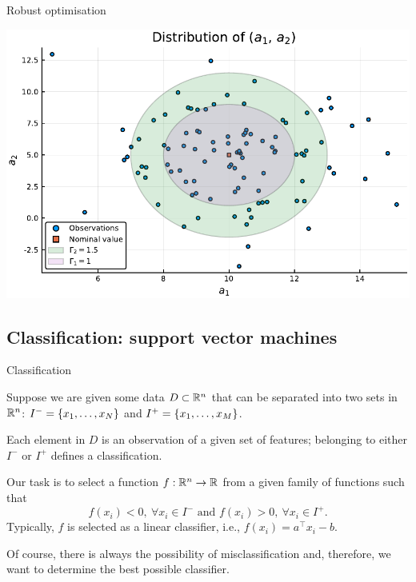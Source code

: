 \begin{frame}{Robust optimisation}

	\includegraphics[width = 1\textwidth]{Figures/data_with_ellipsoid.pdf}

\end{frame}


\subsection{Classification: support vector machines}


\begin{frame}{Classification}

	Suppose we are given some data $D \subset \mathbb R^n$ that can be \alert{separated} into two sets in $\mathbb R^n$: $I^- = \left\{ x_1,\dots, x_N \right \}$ and $I^+ = \left\{ x_1,\dots,x_M \right \}$. 
	
	Each element in $D$ is an \alert{observation} of a given set of \alert{features}; belonging to either $I^-$ or $I^+$ defines a \alert{classification}.
	
	\pause
	Our task is to select a function $f:\mathbb R^n \rightarrow \mathbb R$ from a given family of functions such that
	$$
	f(x_i) < 0, \ \forall x_i \in I^- \text{ and } f(x_i) > 0, \ \forall x_i \in I^+.
	$$ 
	Typically, $f$ is selected as a \alert{linear classifier}, i.e., $f(x_i) = a^\top x_i - b$. 
	
	Of course, there is always the possibility of \alert{misclassification} and, therefore, we want to determine the \alert{best} possible classifier.

\end{frame}



